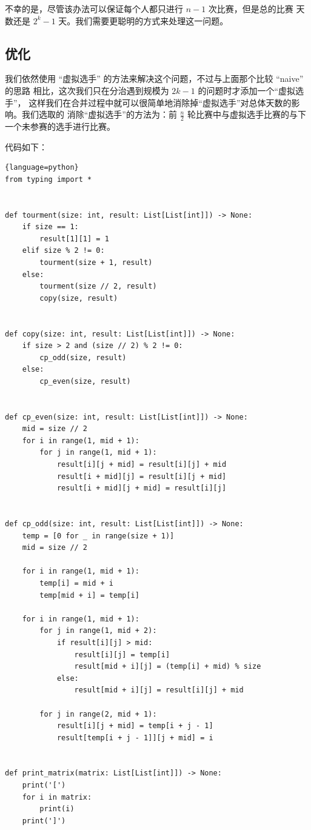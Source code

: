 \documentclass[ichigo,normal,cn]{elegantnote_mod}
\begin{document}
不幸的是，尽管该办法可以保证每个人都只进行 $n - 1$ 次比赛，但是总的比赛
天数还是 $2^k - 1$ 天。我们需要更聪明的方式来处理这一问题。

\subsection{优化}
我们依然使用 ``虚拟选手'' 的方法来解决这个问题，不过与上面那个比较 ``naive'' 的思路
相比，这次我们只在分治遇到规模为 $2k - 1$ 的问题时才添加一个``虚拟选手''，
这样我们在合并过程中就可以很简单地消除掉``虚拟选手''对总体天数的影响。我们选取的
消除``虚拟选手''的方法为：前 $\frac{n}{2}$ 轮比赛中与虚拟选手比赛的与下一个未参赛的选手进行比赛。

代码如下：

\begin{lstlisting}{language=python}
from typing import *


def tourment(size: int, result: List[List[int]]) -> None:
    if size == 1:
        result[1][1] = 1
    elif size % 2 != 0:
        tourment(size + 1, result)
    else:
        tourment(size // 2, result)
        copy(size, result)


def copy(size: int, result: List[List[int]]) -> None:
    if size > 2 and (size // 2) % 2 != 0:
        cp_odd(size, result)
    else:
        cp_even(size, result)


def cp_even(size: int, result: List[List[int]]) -> None:
    mid = size // 2
    for i in range(1, mid + 1):
        for j in range(1, mid + 1):
            result[i][j + mid] = result[i][j] + mid
            result[i + mid][j] = result[i][j + mid]
            result[i + mid][j + mid] = result[i][j]


def cp_odd(size: int, result: List[List[int]]) -> None:
    temp = [0 for _ in range(size + 1)]
    mid = size // 2

    for i in range(1, mid + 1):
        temp[i] = mid + i
        temp[mid + i] = temp[i]

    for i in range(1, mid + 1):
        for j in range(1, mid + 2):
            if result[i][j] > mid:
                result[i][j] = temp[i]
                result[mid + i][j] = (temp[i] + mid) % size
            else:
                result[mid + i][j] = result[i][j] + mid

        for j in range(2, mid + 1):
            result[i][j + mid] = temp[i + j - 1]
            result[temp[i + j - 1]][j + mid] = i


def print_matrix(matrix: List[List[int]]) -> None:
    print('[')
    for i in matrix:
        print(i)
    print(']')



\end{lstlisting}
\end{document}
